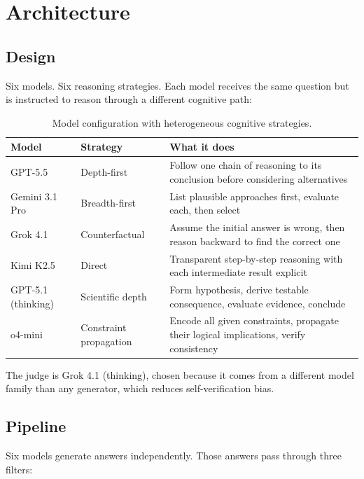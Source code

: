 \documentclass[11pt,a4paper]{article}
\begin{document}
\section{Architecture}

\subsection{Design}

Six models. Six reasoning strategies. Each model receives the same question but is instructed to reason through a different cognitive path:

\begin{table}[ht]
\centering
\caption{Model configuration with heterogeneous cognitive strategies.}
\label{tab:models}
\begin{tabular}{>{\sffamily}ll>{\raggedright\arraybackslash}p{6.5cm}}
\toprule
\textbf{Model} & \textbf{Strategy} & \textbf{What it does} \\
\midrule
GPT-5.5 & Depth-first & Follow one chain of reasoning to its conclusion before considering alternatives \\
Gemini 3.1 Pro & Breadth-first & List plausible approaches first, evaluate each, then select \\
Grok 4.1 & Counterfactual & Assume the initial answer is wrong, then reason backward to find the correct one \\
Kimi K2.5 & Direct & Transparent step-by-step reasoning with each intermediate result explicit \\
GPT-5.1 (thinking) & Scientific depth & Form hypothesis, derive testable consequence, evaluate evidence, conclude \\
o4-mini & Constraint propagation & Encode all given constraints, propagate their logical implications, verify consistency \\
\bottomrule
\end{tabular}
\end{table}

The judge is Grok 4.1 (thinking), chosen because it comes from a different model family than any generator, which reduces self-verification bias.

\subsection{Pipeline}

Six models generate answers independently. Those answers pass through three filters:
\end{document}
